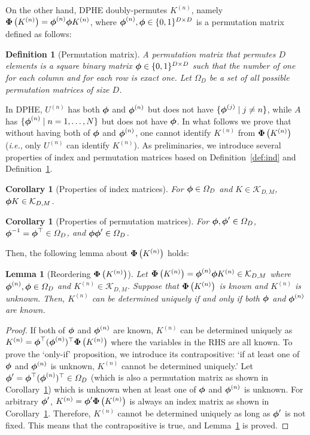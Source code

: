 \documentclass[10pt,twocolumn,letterpaper]{article}
\newtheorem{lemma}[theorem]{Lemma}
\newtheorem{definition}[theorem]{Definition}
\newtheorem{corollary}[theorem]{Corollary}
\def\vct#1{\mbox{\boldmath $#1$}}
\def\ie{{\it i.e.}}
\def\ui#1{^{(#1)}}
\def\perm{\vct{\phi}}
\def\dperm#1{\vct{\Phi}\left(#1\right)}
\begin{document}
On the other hand, DPHE doubly-permutes $K\ui{n}$, namely $\dperm{K\ui{n}}=\perm\ui{n}\perm K\ui{n}$, where $\perm\ui{n}, \perm \in\{0,1\}^{D\times D}$ is a permutation matrix defined as follows:
\begin{definition}[Permutation matrix]
A permutation matrix that permutes $D$ elements is a square binary matrix $\perm\in\{0, 1\}^{D\times D}$ such that the number of one for each column and for each row is exact one. Let $\varOmega_D$ be a set of all possible permutation matrices of size $D$. 
\label{def:perm}
\end{definition}
In DPHE, $U\ui{n}$ has both $\perm$ and $\perm\ui{n}$ but does not have $\{\perm\ui{j}\mid j\neq n\}$, while $A$ has $\{\perm\ui{n}\mid n=1,\dots,N\}$ but does not have $\perm$. In what follows we prove that without having both of $\perm$ and $\perm\ui{n}$, one cannot identify $K\ui{n}$ from $\dperm{K\ui{n}}$ (\ie, only $U\ui{n}$ can identify $K\ui{n}$). As preliminaries, we introduce several properties of index and permutation matrices based on Definition~\ref{def:ind} and Definition~\ref{def:perm}.
\begin{corollary}[Properties of index matrices]
For $\perm\in\varOmega_D$ and $K\in\mathcal{K}_{D, M}$, $\perm K \in \mathcal{K}_{D, M}$. 
\label{col:ind}
\end{corollary}
\begin{corollary}[Properties of permutation matrices]
For $\perm, \perm'\in \varOmega_D$, $\perm^{-1}=\perm^\top \in \varOmega_D$, and $\perm\perm'\in\varOmega_D$. 
\label{col:perm}
\end{corollary}
Then, the following lemma about $\dperm{K\ui{n}}$ holds:
\begin{lemma}[Reordering $\dperm{K\ui{n}}$]
Let $\dperm{K\ui{n}}=\perm\ui{n}\perm K\ui{n}\in\mathcal{K}_{D, M}$ where $\perm\ui{n}, \perm \in \varOmega_D$ and $K\ui{n}\in\mathcal{K}_{D, M}$. Suppose that $\dperm{K\ui{n}}$ is known and $K\ui{n}$ is unknown. Then, $K\ui{n}$ can be determined uniquely if and only if both $\perm$ and $\perm\ui{n}$ are known.
\label{le:getK}
\end{lemma}
\begin{proof}
If both of $\perm$ and $\perm\ui{n}$ are known, $K\ui{n}$ can be determined uniquely as $K\ui{n}=\perm^\top(\perm\ui{n})^\top \dperm{K\ui{n}}$ where the variables in the RHS are all known. To prove the `only-if' proposition, we introduce its contrapositive: `if at least one of $\perm$ and $\perm\ui{n}$ is unknown, $K\ui{n}$ cannot be determined uniquely.' Let $\perm'=\perm^\top(\perm\ui{n})^\top\in\varOmega_D$ (which is also a permutation matrix as shown in Corollary~\ref{col:perm}) which is unknown when at least one of $\perm$ and $\perm\ui{n}$ is unknown. For arbitrary $\perm'$, $K\ui{n}=\perm' \dperm{K\ui{n}}$ is always an index matrix as shown in Corollary~\ref{col:ind}. Therefore, $K\ui{n}$ cannot be determined uniquely as long as $\perm'$ is not fixed. This means that the contrapositive is true, and Lemma~\ref{le:getK} is proved. 
\end{proof}
\end{document}
